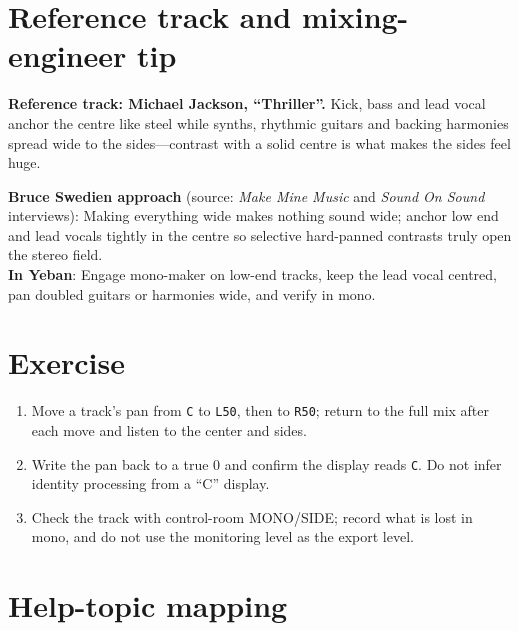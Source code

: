 \section{Reference track and mixing-engineer tip}

\textbf{Reference track: Michael Jackson, ``Thriller''.} Kick, bass and lead vocal anchor the centre like steel while synths, rhythmic guitars and backing harmonies spread wide to the sides—contrast with a solid centre is what makes the sides feel huge.

\begin{tipbox}
\textbf{Bruce Swedien approach} (source: \emph{Make Mine Music} and \emph{Sound On Sound} interviews): Making everything wide makes nothing sound wide; anchor low end and lead vocals tightly in the centre so selective hard-panned contrasts truly open the stereo field.\\
\textbf{In Yeban}: Engage mono-maker on low-end tracks, keep the lead vocal centred, pan doubled guitars or harmonies wide, and verify in mono.
\end{tipbox}

\section{Exercise}


\begin{exercise}
\begin{enumerate}
  \item Move a track's pan from \texttt{C} to \texttt{L50}, then to \texttt{R50}; return to the full mix after each move and listen to the center and sides.
  \item Write the pan back to a true $0$ and confirm the display reads \texttt{C}. Do not infer identity processing from a ``C'' display.
  \item Check the track with control-room MONO/SIDE; record what is lost in mono, and do not use the monitoring level as the export level.
\end{enumerate}
\end{exercise}

\section{Help-topic mapping}

